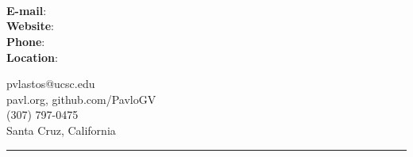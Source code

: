 \documentclass[paper=a4,fontsize=11pt]{article} %
\def \lineWidth         {20.25cm}   %
\def \lineThickness     {1pt}     %
\begin{document}
 

    \noindent
    \begin{minipage}[b]{0.625\linewidth}
    \noindent \\
    \noindent \\
    \noindent \\
    \end{minipage}
    \begin{minipage}[b]{0.1\linewidth}
    \noindent \textbf{E-mail}:\\
    \noindent \textbf{Website}:\\
    \noindent \textbf{Phone}:\\
    \noindent \textbf{Location}:
    \end{minipage}
    \begin{minipage}[b]{0.4\linewidth}
    \noindent pvlastos@ucsc.edu\\
    \noindent pavl.org, github.com/PavloGV\\
     (307) 797-0475\\
    \noindent Santa Cruz, California
    \end{minipage}
    \vspace{-0.725cm}

    \noindent\rule{\lineWidth}{\lineThickness}
\end{document}
